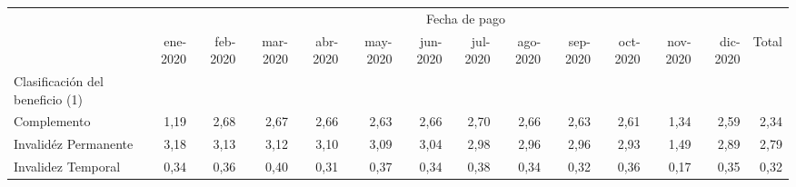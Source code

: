 \begin{tabular}{llllllllllllll}
\cline{1-14}
\multicolumn{1}{c}{} &
  \multicolumn{13}{|c}{Fecha de pago} \\
\multicolumn{1}{c}{} &
  \multicolumn{1}{|r}{ene-2020} &
  \multicolumn{1}{r}{feb-2020} &
  \multicolumn{1}{r}{mar-2020} &
  \multicolumn{1}{r}{abr-2020} &
  \multicolumn{1}{r}{may-2020} &
  \multicolumn{1}{r}{jun-2020} &
  \multicolumn{1}{r}{jul-2020} &
  \multicolumn{1}{r}{ago-2020} &
  \multicolumn{1}{r}{sep-2020} &
  \multicolumn{1}{r}{oct-2020} &
  \multicolumn{1}{r}{nov-2020} &
  \multicolumn{1}{r}{dic-2020} &
  \multicolumn{1}{r}{Total} \\
\cline{1-14}
\multicolumn{1}{l}{Clasificación del beneficio (1)} &
  \multicolumn{1}{|r}{} &
  \multicolumn{1}{r}{} &
  \multicolumn{1}{r}{} &
  \multicolumn{1}{r}{} &
  \multicolumn{1}{r}{} &
  \multicolumn{1}{r}{} &
  \multicolumn{1}{r}{} &
  \multicolumn{1}{r}{} &
  \multicolumn{1}{r}{} &
  \multicolumn{1}{r}{} &
  \multicolumn{1}{r}{} &
  \multicolumn{1}{r}{} &
  \multicolumn{1}{r}{} \\
\multicolumn{1}{l}{\hspace{1em}Complemento} &
  \multicolumn{1}{|r}{1,19} &
  \multicolumn{1}{r}{2,68} &
  \multicolumn{1}{r}{2,67} &
  \multicolumn{1}{r}{2,66} &
  \multicolumn{1}{r}{2,63} &
  \multicolumn{1}{r}{2,66} &
  \multicolumn{1}{r}{2,70} &
  \multicolumn{1}{r}{2,66} &
  \multicolumn{1}{r}{2,63} &
  \multicolumn{1}{r}{2,61} &
  \multicolumn{1}{r}{1,34} &
  \multicolumn{1}{r}{2,59} &
  \multicolumn{1}{r}{2,34} \\
\multicolumn{1}{l}{\hspace{1em}Invalidéz Permanente} &
  \multicolumn{1}{|r}{3,18} &
  \multicolumn{1}{r}{3,13} &
  \multicolumn{1}{r}{3,12} &
  \multicolumn{1}{r}{3,10} &
  \multicolumn{1}{r}{3,09} &
  \multicolumn{1}{r}{3,04} &
  \multicolumn{1}{r}{2,98} &
  \multicolumn{1}{r}{2,96} &
  \multicolumn{1}{r}{2,96} &
  \multicolumn{1}{r}{2,93} &
  \multicolumn{1}{r}{1,49} &
  \multicolumn{1}{r}{2,89} &
  \multicolumn{1}{r}{2,79} \\
\multicolumn{1}{l}{\hspace{1em}Invalidez Temporal} &
  \multicolumn{1}{|r}{0,34} &
  \multicolumn{1}{r}{0,36} &
  \multicolumn{1}{r}{0,40} &
  \multicolumn{1}{r}{0,31} &
  \multicolumn{1}{r}{0,37} &
  \multicolumn{1}{r}{0,34} &
  \multicolumn{1}{r}{0,38} &
  \multicolumn{1}{r}{0,34} &
  \multicolumn{1}{r}{0,32} &
  \multicolumn{1}{r}{0,36} &
  \multicolumn{1}{r}{0,17} &
  \multicolumn{1}{r}{0,35} &
  \multicolumn{1}{r}{0,32} \\

\end{tabular}
